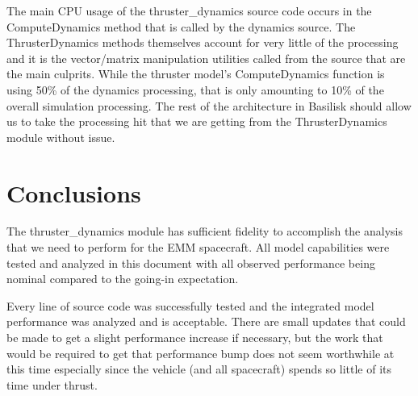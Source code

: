 \documentclass[]{BasiliskReportMemo}
\begin{document}
The main CPU usage of the thruster\_dynamics source code occurs in the 
ComputeDynamics method that is called by the dynamics source.  The 
ThrusterDynamics methods themselves account for very little of the processing 
and it is the vector/matrix manipulation utilities called from the source that 
are the main culprits.  While the thruster model's ComputeDynamics function is 
using 50\% of the dynamics processing, that is only amounting to 10\% of the 
overall simulation processing.  The rest of the architecture in Basilisk should 
allow us to take the processing hit that we are getting from the 
ThrusterDynamics module without issue.

\section{Conclusions}
The thruster\_dynamics module has sufficient fidelity to accomplish the analysis 
that we need to perform for the EMM spacecraft.  All model capabilities were 
tested and analyzed in this document with all observed performance being nominal 
compared to the going-in expectation.  

Every line of source code was successfully tested and the integrated model 
performance was analyzed and is acceptable.  There are small updates that could 
be made to get a slight performance increase if necessary, but the work that 
would be required to get that performance bump does not seem worthwhile at this 
time especially since the vehicle (and all spacecraft) spends so little of its 
time under thrust.
\end{document}
